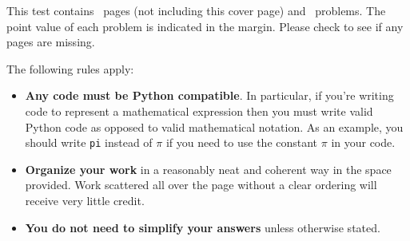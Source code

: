 \documentclass[exam, 12pt]{wvwcdocs}
\begin{document}
\lstset{language=python}
\begin{coverpages}

    \noindent
    This test contains \numpages\ pages (not including this cover page) and \numquestions\ problems.
    The point value of each problem is indicated in the margin.
    Please check to see if any pages are missing.

    \noindent
    The following rules apply:

    \begin{minipage}[t]{.5\linewidth}
        \vspace{0pt}
        \begin{itemize}

            \item \textbf{Any code must be Python compatible}.
                  In particular, if you're writing code to represent a mathematical expression then you must write valid Python code as opposed to valid mathematical notation.
                  As an example, you should write \texttt{pi} instead of $\pi$ if you need to use the constant $\pi$ in your code.

            \item \textbf{Organize your work} in a reasonably neat and coherent way in the space provided.
                  Work scattered all over the page without a clear ordering will receive very little credit.


            \item \textbf{You do not need to simplify your answers} unless otherwise stated.
        \end{itemize}

        \vspace{1cm}


\end{minipage}
\end{coverpages}
\end{document}

